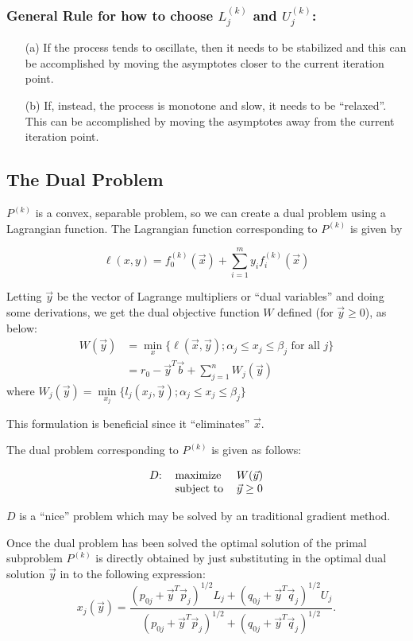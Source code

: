 \subsubsection*{General Rule for how to choose $L_j^{(k)}$ and $U_j^{(k)}$:}
\begin{itemize}
	\item[(a)] If the process tends to oscillate, then it needs to be stabilized and this can be accomplished by moving the asymptotes closer to the current iteration point.
	\item[(b)] If, instead, the process is monotone and slow, it needs to be ``relaxed''. This can be accomplished by moving the asymptotes away from the current iteration point.
\end{itemize}

\subsection{The Dual Problem}

$P^{(k)}$ is a convex, separable problem, so we can create a dual problem using a Lagrangian function. The Lagrangian function corresponding to $P^{(k)}$ is given by 

$$\ell(x,y)=f_0^{(k)}(\vec{x})+\sum\limits_{i=1}^{m}y_if_i^{(k)}(\vec{x})$$

Letting $\vec{y}$ be the vector of Lagrange multipliers or ``dual variables'' and doing some derivations, we get the dual objective function $W$ defined (for $\vec{y}\geq 0$), as below:
\begin{align*}
	W(\vec{y}) & =\min\limits_x\lbrace\ell(\vec{x},\vec{y}); \alpha_j\leq x_j\leq \beta_j\text{ for all }j\rbrace \\
	           & =r_0-\vec{y}^T\vec{b}+\sum\limits_{j=1}^{n}W_j(\vec{y})                                          
\end{align*}
where $W_j(\vec{y})=\min\limits_{x_j}\lbrace l_j(x_j,\vec{y}); \alpha_j\leq x_j\leq \beta_j\rbrace$

This formulation is beneficial since it ``eliminates'' $\vec{x}$.

The dual problem corresponding to $P^{(k)}$ is given as follows:

\begin{equation}
	\begin{tabular}{lll}
		$D$: & maximize   & $W(\vec{y})$    \\
		     & subject to & $\vec{y}\geq 0$
	\end{tabular}
\end{equation}
                                     
$D$ is a ``nice'' problem which may be solved by an traditional gradient method.

Once the dual problem has been solved the optimal solution of the primal subproblem $P^{(k)}$ is directly obtained by just substituting in the optimal dual solution $\vec{y}$ in to the following expression:
$$x_j(\vec{y})=\frac{\left(p_{0j}+\vec{y}^T\vec{p}_j\right)^{1/2}L_j+\left(q_{0j}+\vec{y}^T\vec{q}_j\right)^{1/2}U_j}{\left(p_{0j}+\vec{y}^T\vec{p}_j\right)^{1/2}+\left(q_{0j}+\vec{y}^T\vec{q}_j\right)^{1/2}}.$$